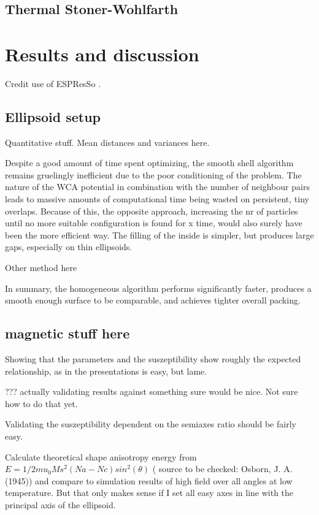 \documentclass[12pt, DIV=12]{scrartcl}
\begin{document}
\subsection{Thermal Stoner-Wohlfarth}

\cite{Mostarac2025}



\section{Results and discussion}

Credit use of ESPResSo \cite{Weeber2024} \cite{Weik2019} \cite{Grad2026}.

\subsection{Ellipsoid setup}

Quantitative stuff. Mean distances and variances here.

Despite a good amount of time spent optimizing, the smooth shell algorithm remains gruelingly inefficient due to the poor conditioning of the problem. The nature of the WCA potential in combination with the number of neighbour pairs leads to massive amounts of computational time being wasted on persistent, tiny overlaps. Because of this, the opposite approach, increasing the nr of particles until no more suitable configuration is found for x time, would also surely have been the more efficient way.
The filling of the inside is simpler, but produces large gaps, especially on thin ellipsoids.

Other method here

In summary, the homogeneous algorithm performs significantly faster, produces a smooth enough surface to be comparable, and achieves tighter overall packing.

\subsection{magnetic stuff here}

Showing that the parameters and the suszeptibility show roughly the expected relationship, as in the presentations is easy, but lame.

??? actually validating results against something sure would be nice. Not sure how to do that yet.

Validating the suszeptibility dependent on the semiaxes ratio should be fairly easy.

Calculate theoretical shape anisotropy energy from $E=1/2mu_0Ms^2(Na-Nc)sin^2(\theta)$ ( source to be checked: Osborn, J. A. (1945)) and compare to simulation results of high field over all angles at low temperature.
But that only makes sense if I set all easy axes in line with the principal axis of the ellipsoid.
\end{document}
